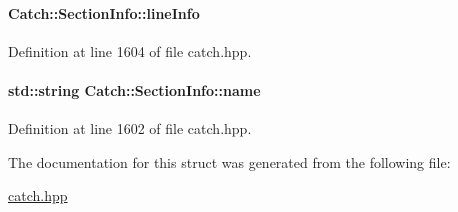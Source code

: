 \paragraph[{line\+Info}]{ Catch\+::\+Section\+Info\+::line\+Info}\label{a00073_adbc83b8a3507c4acc8ee249e93465711}


Definition at line 1604 of file catch.\+hpp.

\hypertarget{a00073_a704c8fc662d309137e0d4f199cb7df58}{}
\paragraph[{name}]{\setlength{\rightskip}{0pt plus 5cm}std\+::string Catch\+::\+Section\+Info\+::name}\label{a00073_a704c8fc662d309137e0d4f199cb7df58}


Definition at line 1602 of file catch.\+hpp.



The documentation for this struct was generated from the following file\+:\begin{DoxyCompactItemize}
\item 
\hyperlink{a00094}{catch.\+hpp}\end{DoxyCompactItemize}
